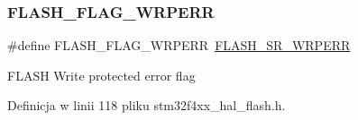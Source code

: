 \subsubsection{\texorpdfstring{F\+L\+A\+S\+H\+\_\+\+F\+L\+A\+G\+\_\+\+W\+R\+P\+E\+RR}{FLASH\_FLAG\_WRPERR}}
{\footnotesize\ttfamily \#define F\+L\+A\+S\+H\+\_\+\+F\+L\+A\+G\+\_\+\+W\+R\+P\+E\+RR~\hyperlink{group___peripheral___registers___bits___definition_gabf6f52f59b01530928d747cf32bd4d01}{F\+L\+A\+S\+H\+\_\+\+S\+R\+\_\+\+W\+R\+P\+E\+RR}}

F\+L\+A\+SH Write protected error flag 

Definicja w linii 118 pliku stm32f4xx\+\_\+hal\+\_\+flash.\+h.

